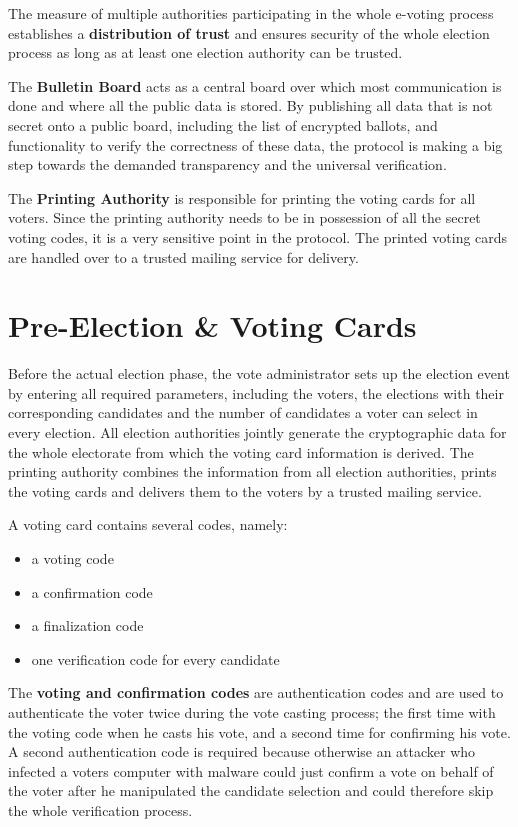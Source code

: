 The measure of multiple authorities participating in the whole e-voting process establishes a \textbf{distribution of trust} and ensures security of the whole election process as long as at least one election authority can be trusted.

The \textbf{Bulletin Board} acts as a central board over which most communication is done and where all the public data is stored. By publishing all data that is not secret onto a public board, including the list of encrypted ballots, and functionality to verify the correctness of these data, the protocol is making a big step towards the demanded transparency and the universal verification.

The \textbf{Printing Authority} is responsible for printing the voting cards for all voters. Since the printing authority needs to be in possession of all the secret voting codes, it is a very sensitive point in the protocol. The printed voting cards are handled over to a trusted mailing service for delivery.

\section{Pre-Election \& Voting Cards}
Before the actual election phase, the vote administrator sets up the election event by entering all required parameters, including the voters, the elections with their corresponding candidates and the number of candidates a voter can select in every election. All election authorities jointly generate the cryptographic data for the whole electorate from which the voting card information is derived. The printing authority combines the information from all election authorities, prints the voting cards and delivers them to the voters by a trusted mailing service.

A voting card contains several codes, namely:

\begin{itemize}
	\item a voting code
	\item a confirmation code
	\item a finalization code
	\item one verification code for every candidate
\end{itemize}

The \textbf{voting and confirmation codes} are authentication codes and are used to authenticate the voter twice during the vote casting process; the first time with the voting code when he casts his vote, and a second time for confirming his vote. A second authentication code is required because otherwise an attacker who infected a voters computer with malware could just confirm a vote on behalf of the voter after he manipulated the candidate selection and could therefore skip the whole verification process.

